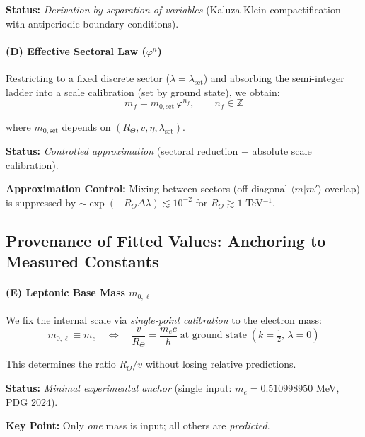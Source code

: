 \documentclass[12pt]{article}
\begin{document}
\textbf{Status:} \textit{Derivation by separation of variables} (Kaluza-Klein compactification with antiperiodic boundary conditions).

\paragraph{(D) Effective Sectoral Law ($\varphi^n$)}

Restricting to a fixed discrete sector ($\lambda = \lambda_{\text{set}}$) and absorbing the semi-integer ladder into a scale calibration (set by ground state), we obtain:
\begin{equation}
\boxed{m_f = m_{0,\text{set}} \, \varphi^{n_f}, \qquad n_f \in \mathbb{Z}}
\end{equation}

where $m_{0,\text{set}}$ depends on $(R_\Theta, v, \eta, \lambda_{\text{set}})$.

\textbf{Status:} \textit{Controlled approximation} (sectoral reduction + absolute scale calibration).

\textbf{Approximation Control:} Mixing between sectors (off-diagonal $\langle m | m' \rangle$ overlap) is suppressed by $\sim \exp(-R_\Theta \Delta\lambda) \lesssim 10^{-2}$ for $R_\Theta \gtrsim 1$ TeV$^{-1}$.

\subsection{Provenance of Fitted Values: Anchoring to Measured Constants}

\paragraph{(E) Leptonic Base Mass $m_{0,\ell}$}

We fix the internal scale via \textit{single-point calibration} to the electron mass:
\begin{equation}
m_{0,\ell} \equiv m_e \quad \Longleftrightarrow \quad \frac{v}{R_\Theta} = \frac{m_e c}{\hbar} \;\text{at ground state}\; (k = \tfrac{1}{2},\, \lambda = 0)
\end{equation}

This determines the ratio $R_\Theta / v$ without losing relative predictions.

\textbf{Status:} \textit{Minimal experimental anchor} (single input: $m_e = 0.510998950$ MeV, PDG 2024).

\textbf{Key Point:} Only \textit{one} mass is input; all others are \textit{predicted}.
\end{document}
